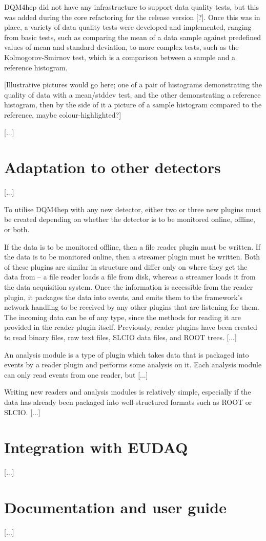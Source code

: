 DQM4hep did not have any infrastructure to support data quality tests, but this was added during the core refactoring for the release version [?]. Once this was in place, a variety of data quality tests were developed and implemented, ranging from basic tests, such as comparing the mean of a data sample against predefined values of mean and standard deviation, to more complex tests, such as the Kolmogorov-Smirnov test, which is a comparison between a sample and a reference histogram.

[Illustrative pictures would go here; one of a pair of histograms demonstrating the quality of data with a mean/stddev test, and the other demonstrating a reference histogram, then by the side of it a picture of a sample histogram compared to the reference, maybe colour-highlighted?]

[...]

\section{Adaptation to other detectors}
[...]

To utilise DQM4hep with any new detector, either two or three new plugins must be created depending on whether the detector is to be monitored online, offline, or both.

If the data is to be monitored offline, then a file reader plugin must be written. If the data is to be monitored online, then a streamer plugin must be written. Both of these plugins are similar in structure and differ only on where they get the data from -- a file reader loads a file from disk, whereas a streamer loads it from the data acquisition system. Once the information is accessible from the reader plugin, it packages the data into events, and emits them to the framework's network handling to be received by any other plugins that are listening for them. The incoming data can be of any type, since the methods for reading it are provided in the reader plugin itself. Previously, reader plugins have been created to read binary files, raw text files, SLCIO data files, and ROOT trees. [...]

An analysis module is a type of plugin which takes data that is packaged into events by a reader plugin and performs some analysis on it. Each analysis module can only read events from one reader, but [...] 

Writing new readers and analysis modules is relatively simple, especially if the data has already been packaged into well-structured formats such as ROOT or SLCIO. [...]


\section{Integration with EUDAQ}
[...]

\section{Documentation and user guide}
[...]
